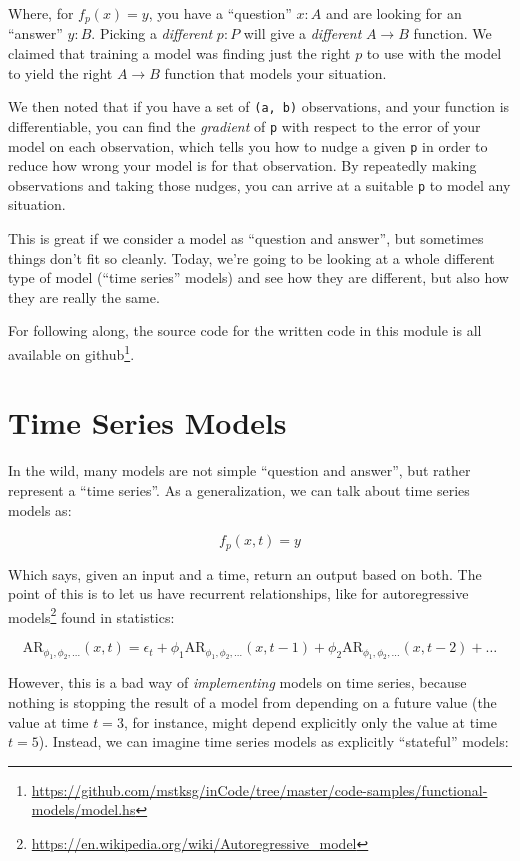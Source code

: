 \documentclass[]{article}
\renewcommand{\href}[2]{#2\footnote{\url{#1}}}
\begin{document}
Where, for \(f_p(x) = y\), you have a ``question'' \(x : A\) and are looking for
an ``answer'' \(y : B\). Picking a \emph{different} \(p : P\) will give a
\emph{different} \(A
\rightarrow B\) function. We claimed that training a model was finding just the
right \(p\) to use with the model to yield the right \(A \rightarrow B\)
function that models your situation.

We then noted that if you have a set of \texttt{(a,\ b)} observations, and your
function is differentiable, you can find the \emph{gradient} of \texttt{p} with
respect to the error of your model on each observation, which tells you how to
nudge a given \texttt{p} in order to reduce how wrong your model is for that
observation. By repeatedly making observations and taking those nudges, you can
arrive at a suitable \texttt{p} to model any situation.

This is great if we consider a model as ``question and answer'', but sometimes
things don't fit so cleanly. Today, we're going to be looking at a whole
different type of model (``time series'' models) and see how they are different,
but also how they are really the same.

For following along, the source code for the written code in this module is all
available
\href{https://github.com/mstksg/inCode/tree/master/code-samples/functional-models/model.hs}{on
github}.

\section{Time Series Models}\label{time-series-models}

In the wild, many models are not simple ``question and answer'', but rather
represent a ``time series''. As a generalization, we can talk about time series
models as:

\[
f_p(x,t) = y
\]

Which says, given an input and a time, return an output based on both. The point
of this is to let us have recurrent relationships, like for
\href{https://en.wikipedia.org/wiki/Autoregressive_model}{autoregressive models}
found in statistics:

\[
\text{AR}_{\phi_1, \phi_2, \ldots}(x,t)
  = \epsilon_t + \phi_1 \text{AR}_{\phi_1, \phi_2, \ldots}(x, t-1)
  + \phi_2 \text{AR}_{\phi_1, \phi_2, \ldots}(x, t-2)
  + \ldots
\]

However, this is a bad way of \emph{implementing} models on time series, because
nothing is stopping the result of a model from depending on a future value (the
value at time \(t = 3\), for instance, might depend explicitly only the value at
time \(t = 5\)). Instead, we can imagine time series models as explicitly
``stateful'' models:
\end{document}

